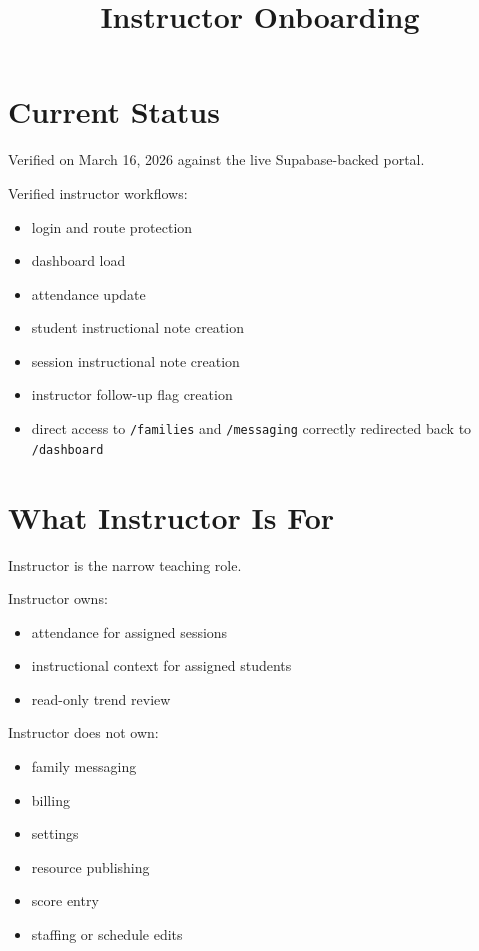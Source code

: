 \documentclass[11pt]{article}
\title{Instructor Onboarding}
\author{}
\date{}
\begin{document}
\maketitle

\section*{Current Status}
Verified on March 16, 2026 against the live Supabase-backed portal.

Verified instructor workflows:
\begin{itemize}
  \item login and route protection
  \item dashboard load
  \item attendance update
  \item student instructional note creation
  \item session instructional note creation
  \item instructor follow-up flag creation
  \item direct access to \texttt{/families} and \texttt{/messaging} correctly redirected back to \texttt{/dashboard}
\end{itemize}

\section*{What Instructor Is For}
Instructor is the narrow teaching role.

Instructor owns:
\begin{itemize}
  \item attendance for assigned sessions
  \item instructional context for assigned students
  \item read-only trend review
\end{itemize}

Instructor does not own:
\begin{itemize}
  \item family messaging
  \item billing
  \item settings
  \item resource publishing
  \item score entry
  \item staffing or schedule edits
\end{itemize}
\end{document}
